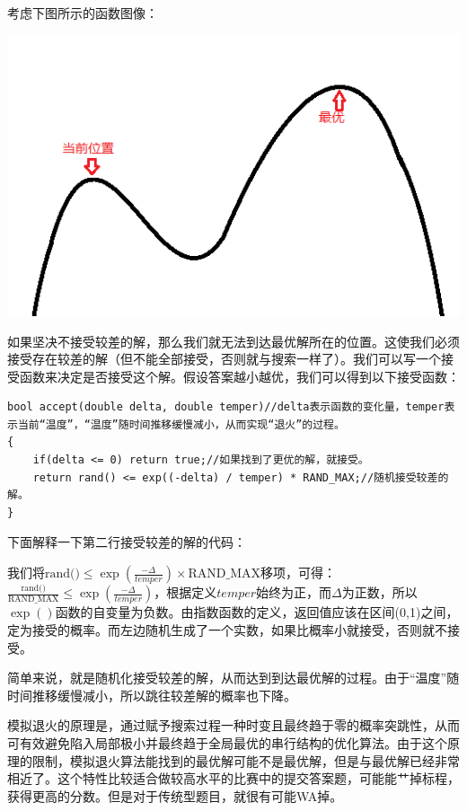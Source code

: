 \documentclass{article}
\theoremstyle{nonumberplain}
\begin{document}
	考虑下图所示的函数图像：
	\begin{center}\includegraphics[scale=0.3]{sa.png}\end{center}
	如果坚决不接受较差的解，那么我们就无法到达最优解所在的位置。这使我们必须接受存在较差的解（但不能全部接受，否则就与搜索一样了）。我们可以写一个接受函数来决定是否接受这个解。假设答案越小越优，我们可以得到以下接受函数：
	\begin{verbatim}
bool accept(double delta, double temper)//delta表示函数的变化量，temper表示当前“温度”，“温度”随时间推移缓慢减小，从而实现“退火”的过程。
{
    if(delta <= 0) return true;//如果找到了更优的解，就接受。
    return rand() <= exp((-delta) / temper) * RAND_MAX;//随机接受较差的解。
}
\end{verbatim}
	下面解释一下第二行接受较差的解的代码：

	我们将$\textrm{rand()}\leq \exp(\frac{-\Delta}{temper})\times\textrm{RAND\_MAX}$移项，可得：
$\frac{\textrm{rand()}}{\textrm{RAND\_MAX}}\leq\exp(\frac{-\Delta}{temper})$，根据定义$temper$始终为正，而$\Delta$为正数，所以$\exp()$函数的自变量为负数。由指数函数的定义，返回值应该在区间(0,1)之间，定为接受的概率。而左边随机生成了一个实数，如果比概率小就接受，否则就不接受。

	简单来说，就是随机化接受较差的解，从而达到到达最优解的过程。由于“温度”随时间推移缓慢减小，所以跳往较差解的概率也下降。

	模拟退火的原理是，通过赋予搜索过程一种时变且最终趋于零的概率突跳性，从而可有效避免陷入局部极小并最终趋于全局最优的串行结构的优化算法。由于这个原理的限制，模拟退火算法能找到的最优解可能不是最优解，但是与最优解已经非常相近了。这个特性比较适合做较高水平的比赛中的提交答案题，可能能艹掉标程，获得更高的分数。但是对于传统型题目，就很有可能WA掉。
\end{document}
